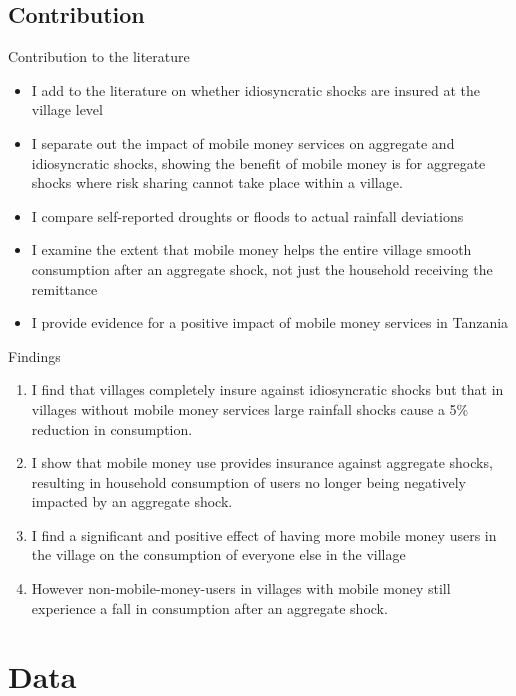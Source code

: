 \documentclass[t]{beamer}
\begin{document}
\subsection*{Contribution}
\begin{frame}{Contribution to the literature}
\begin{itemize}
\item I add to the literature on whether idiosyncratic shocks are insured at the village level \pause
\item I separate out the impact of mobile money services on aggregate and idiosyncratic shocks, showing the benefit of mobile money is for aggregate shocks where risk sharing cannot take place within a village.  \pause
\item I compare self-reported droughts or floods to actual rainfall deviations  \pause	
\item I examine the extent that mobile money helps the entire village smooth consumption after an aggregate shock, not just the household receiving the remittance  \pause	
\item I provide evidence for a positive impact of mobile money services in Tanzania
\end{itemize}
\end{frame}
\begin{frame}{Findings}
\begin{enumerate}
\item I find that villages completely insure against idiosyncratic shocks but that in villages without mobile money services large rainfall shocks cause a 5\% reduction in consumption. \pause
\item I show that mobile money use provides insurance against aggregate shocks, resulting
in household consumption of users no longer being negatively impacted by an aggregate shock.\pause
\item I find a significant and positive effect of having more mobile money users in the village on
the consumption of everyone else in the village\pause
\item However non-mobile-money-users in villages with mobile money still experience a fall in consumption after an aggregate shock.
\end{enumerate}
\end{frame}


\section{Data}
\end{document}
